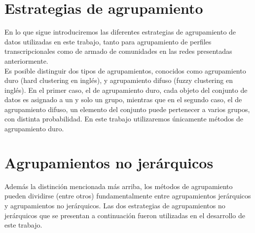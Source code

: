 \section{Estrategias de agrupamiento}
En lo que sigue introduciremos las diferentes estrategias de agrupamiento de datos utilizadas en este trabajo, tanto para agrupamiento de perfiles transcripcionales como de armado de comunidades en las redes presentadas anteriormente.\\
Es posible distinguir dos tipos de agrupamientos, conocidos como agrupamiento duro (hard clustering en inglés), y agrupamiento difuso (fuzzy clustering en inglés). En el primer caso, el de agrupamiento duro, cada objeto del conjunto de datos es asignado a un y solo un grupo, mientras que en el segundo caso, el de agrupamiento difuso, un elemento del conjunto puede pertenecer a varios grupos, con distinta probabilidad. En este trabajo utilizaremos únicamente métodos de agrupamiento duro.\\
\section{Agrupamientos no jerárquicos}
Además la distinción mencionada más arriba, los métodos de agrupamiento pueden dividirse (entre otros) fundamentalmente entre agrupamientos jerárquicos y agrupamientos no jerárquicos.
Las dos estrategias de agrupamientos no jerárquicos que se presentan a continuación fueron utilizadas en el desarrollo de este trabajo.
